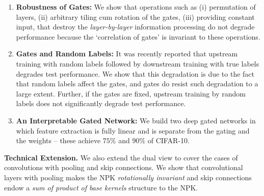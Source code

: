 \begin{enumerate}
\item \textbf{Robustness of Gates:} We show that operations such as (i) permutation of layers, (ii) arbitrary tiling cum rotation of the gates, (iii) providing constant input, that destroy the \emph{layer-by-layer} information processing do not degrade performance because the `correlation of gates' is invariant to these operations.
\item \textbf{Gates and Random Labels:} It was recently reported  that upstream training with random labels followed by downstream training with true labels degrades test performance. We show that this degradation is due to the fact that random labels affect the gates, and gates do resist such degradation to a large extent. Further, if the gates are fixed, upstream training by random labels does not significantly degrade test performance.
\item \textbf{An Interpretable Gated Network:} We build two deep gated networks in which feature extraction is fully linear and is separate from the gating and the weights -- these achieve $75\%$ and $90\%$ of CIFAR-10.

\end{enumerate}
\textbf{Technical Extension.} We also extend the dual view to cover the cases of convolutions with pooling and skip connections. We show that convolutional layers with pooling makes the NPK \emph{rotationally invariant} and skip connections endow a \emph{sum of product of base kernels} structure to the NPK.
\begin{comment}

CNN, Resnet to say that the framework can be extended successfully.

Perhaps the second important and powerful insights lie in the experimental implication contribution

why do we even care for a specific theory?

All through we differentiate from \cite{npk}
\end{comment}